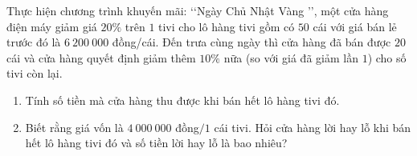 \begin{bt}%
	Thực hiện chương trình khuyến mãi: \lq\lq Ngày Chủ Nhật Vàng \rq\rq, một cửa hàng điện máy giảm giá $20\%$ trên $1$ tivi cho lô hàng tivi gồm có $50$ cái với giá bán lẻ trước đó là $6\ 200\ 000$ đồng/cái. Đến trưa cùng ngày thì cửa hàng đã bán được $20$ cái và cửa hàng quyết định giảm thêm $10\%$ nữa (so với giá đã giảm lần $1$) cho số tivi còn lại.
	\begin{enumerate}
		\item Tính số tiền mà cửa hàng thu được khi bán hết lô hàng tivi đó.
		\item Biết rằng giá vốn là $4\ 000\ 000$ đồng$/1$ cái tivi. Hỏi cửa hàng lời hay lỗ khi bán hết lô hàng tivi đó và số tiền lời hay lỗ là bao nhiêu?
	\end{enumerate}
\end{bt}


